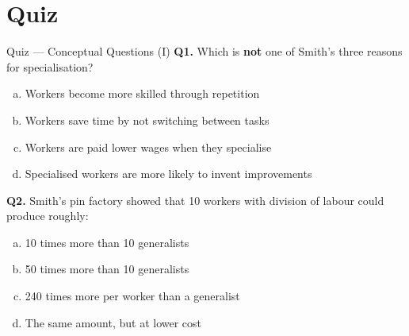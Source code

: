 \documentclass[aspectratio=169, 10pt]{beamer}
\begin{document}
\section{Quiz}

\begin{frame}{Quiz --- Conceptual Questions (I)}
\textbf{Q1.} Which is \textbf{not} one of Smith's three reasons for
specialisation?
\begin{enumerate}[(a)]
  \item Workers become more skilled through repetition
  \item Workers save time by not switching between tasks
  \item Workers are paid lower wages when they specialise
  \item Specialised workers are more likely to invent improvements
\end{enumerate}
\vspace{0.5em}
\textbf{Q2.} Smith's pin factory showed that 10 workers with
division of labour could produce roughly:
\begin{enumerate}[(a)]
  \item 10 times more than 10 generalists
  \item 50 times more than 10 generalists
  \item 240 times more per worker than a generalist
  \item The same amount, but at lower cost
\end{enumerate}
\end{frame}
\end{document}
